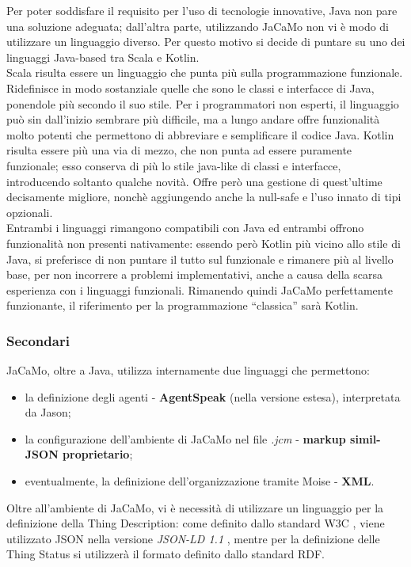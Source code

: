 \documentclass[12pt,a4paper,openright,oneside]{report}
\newcommand{\quotes}[1]{``#1''}
\begin{document}
Per poter soddisfare il requisito per l'uso di tecnologie innovative, Java non pare una soluzione adeguata; dall'altra parte, utilizzando JaCaMo non vi è modo di utilizzare un linguaggio diverso. Per questo motivo si decide di puntare su uno dei linguaggi Java-based tra Scala e Kotlin.\\

Scala risulta essere un linguaggio che punta più sulla programmazione funzionale. Ridefinisce in modo sostanziale quelle che sono le classi e interfacce di Java, ponendole più secondo il suo stile. Per i programmatori non esperti, il linguaggio può sin dall'inizio sembrare più difficile, ma a lungo andare offre funzionalità molto potenti che permettono di abbreviare e semplificare il codice Java. Kotlin risulta essere più una via di mezzo, che non punta ad essere puramente funzionale; esso conserva di più lo stile java-like di classi e interfacce, introducendo soltanto qualche novità. Offre però una gestione di quest'ultime decisamente migliore, nonchè aggiungendo anche la null-safe e l'uso innato di tipi opzionali.\\

Entrambi i linguaggi rimangono compatibili con Java ed entrambi offrono funzionalità non presenti nativamente: essendo però Kotlin più vicino allo stile di Java, si preferisce di non puntare il tutto sul funzionale e rimanere più al livello base, per non incorrere a problemi implementativi, anche a causa della scarsa esperienza con i linguaggi funzionali. Rimanendo quindi JaCaMo perfettamente funzionante, il riferimento per la programmazione \quotes{classica} sarà Kotlin.

\subsubsection{Secondari}
JaCaMo, oltre a Java, utilizza internamente due linguaggi che permettono:
\begin{itemize}
	\item la definizione degli agenti - \textbf{AgentSpeak} (nella versione estesa), interpretata da Jason;
	\item la configurazione dell'ambiente di JaCaMo nel file \textit{.jcm} - \textbf{markup simil-JSON proprietario};
	\item eventualmente, la definizione dell'organizzazione tramite Moise - \textbf{XML}.
\end{itemize}
 
Oltre all'ambiente di JaCaMo, vi è necessità di utilizzare un linguaggio per la definizione della Thing Description: come definito dallo standard W3C \cite{td}, viene utilizzato JSON nella versione \textit{JSON-LD 1.1} \cite{json-ld}, mentre per la definizione delle Thing Status si utilizzerà il formato definito dallo standard RDF.\\
\end{document}

